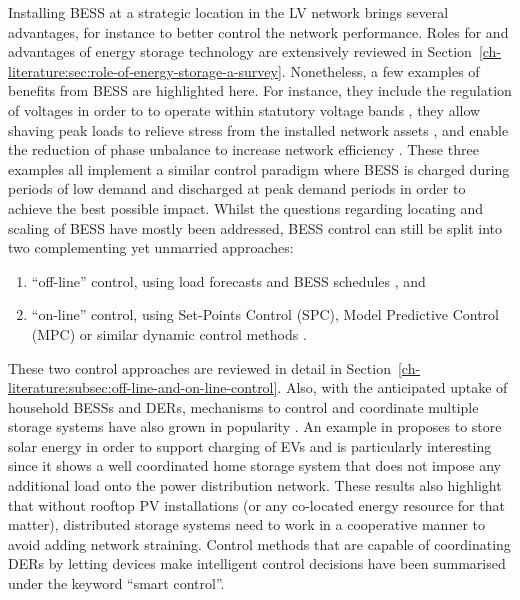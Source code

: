 Installing BESS at a strategic location in the LV network brings several advantages, for instance to better control the network performance.
Roles for and advantages of energy storage technology are extensively reviewed in Section~\ref{ch-literature:sec:role-of-energy-storage-a-survey}.
Nonetheless, a few examples of benefits from BESS are highlighted here.
For instance, they include the regulation of voltages in order to to operate within statutory voltage bands \cite{Yang2014}, they allow shaving peak loads to relieve stress from the installed network assets \cite{Bennett2015}, and enable the reduction of phase unbalance to increase network efficiency \cite{Wang2015b}.
These three examples all implement a similar control paradigm where BESS is charged during periods of low demand and discharged at peak demand periods in order to achieve the best possible impact.
Whilst the questions regarding locating and scaling of BESS have mostly been addressed, BESS control can still be split into two complementing yet unmarried approaches:

\begin{enumerate}
	\item ``off-line'' control, using load forecasts and BESS schedules \cite{Cecati2011, Chaouachi2013, Palma-Behnke2013, Khodaei2014}, and
	\item ``on-line'' control, using Set-Points Control (SPC), Model Predictive Control (MPC) or similar dynamic control methods \cite{Salinas2013, Huang2013, Huang2014a, Sun2014a}.
\end{enumerate}

These two control approaches are reviewed in detail in Section~\ref{ch-literature:subsec:off-line-and-on-line-control}.
Also, with the anticipated uptake of household BESSs and DERs, mechanisms to control and coordinate multiple storage systems have also grown in popularity \cite{Mokhtari2013, Sarker2015, Baker2016a, Baumann2017}.
An example in \cite{Baumann2017} proposes to store solar energy in order to support charging of EVs and is particularly interesting since it shows a well coordinated home storage system that does not impose any additional load onto the power distribution network.
These results also highlight that without rooftop PV installations (or any co-located energy resource for that matter), distributed storage systems need to work in a cooperative manner to avoid adding network straining.
Control methods that are capable of coordinating DERs by letting devices make intelligent control decisions have been summarised under the keyword ``smart control''.

